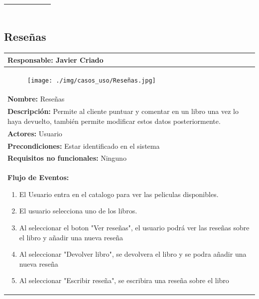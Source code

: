 \documentclass{report}
\begin{document}
\begin{center}
\begin{longtable}{|p{\linewidth}|}
\begin{figure}[H]
                    \end{figure}\\
                    \hline
                \end{longtable}
            \end{center}
        \clearpage

        \subsection{Reseñas}
        \begin{center}
            \begin{longtable}{|p{\linewidth}|}
                \hline
                \textbf{Responsable:} Javier Criado\\
                \hline
                \begin{figure}[H]
                    \centering
                    \texttt{[image: ./img/casos\_uso/Reseñas.jpg]}
                \end{figure}\\
                \hline
                \textbf{Nombre:} Reseñas\\
                \hline
                \textbf{Descripción:} Permite al cliente puntuar y comentar en un libro una vez lo haya devuelto, también permite modificar estos datos posteriormente.\\
                \hline
                \textbf{Actores:} Usuario\\
                \hline
                \textbf{Precondiciones:} Estar identificado en el sistema\\
                \hline
                \textbf{Requisitos no funcionales:} Ninguno\\
                \hline
                \textbf{Flujo de Eventos:}
                \begin{enumerate}
                    \item El Usuario entra en el catalogo para ver las peliculas disponibles.
                    \item El usuario selecciona uno de los libros.
                    \item Al seleccionar el boton "Ver reseñas", el usuario podrá ver las reseñas sobre el libro y añadir una nueva reseña
                    \item Al seleccionar "Devolver libro", se devolvera el libro y se podra añadir una nueva reseña
                    \item Al seleccionar "Escribir reseña", se escribira una reseña sobre el libro  

\end{enumerate}
\end{longtable}
\end{center}
\end{document}

